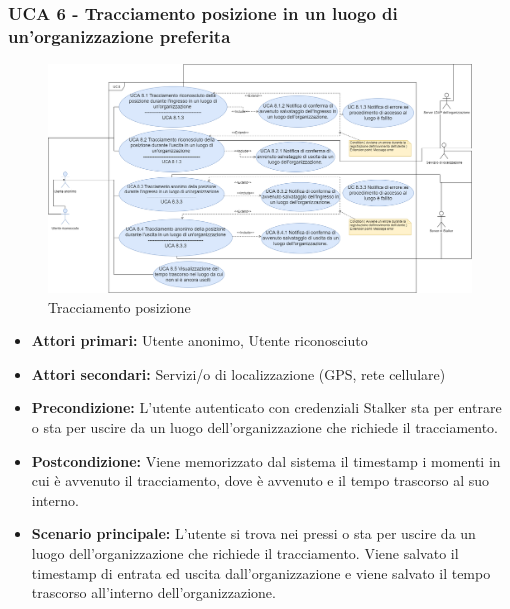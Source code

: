 \newpage

\subsubsection{UCA 6 - Tracciamento posizione in un luogo di un'organizzazione preferita}%

\begin{figure}[h]
	\centering
	\includegraphics[scale=0.3]{sezioni/UseCase/Immagini/UCA6.png}
	\caption{Tracciamento posizione}
\end{figure}

\begin{itemize}
	\item \textbf{Attori primari:} Utente anonimo, Utente riconosciuto
	\item \textbf{Attori secondari:} Servizi/o di localizzazione (GPS, rete cellulare)
	\item \textbf{Precondizione:} L'utente autenticato con credenziali Stalker sta per entrare o sta per uscire da un luogo dell'organizzazione che richiede il tracciamento.
	\item \textbf{Postcondizione:} Viene memorizzato dal sistema il timestamp i momenti in cui è avvenuto il tracciamento, dove è avvenuto e il tempo trascorso al suo interno.
	\item \textbf{Scenario principale:} L'utente si trova nei pressi o sta per uscire da un luogo dell'organizzazione che richiede il tracciamento. Viene salvato il timestamp di entrata ed uscita dall'organizzazione e viene salvato il tempo trascorso all'interno dell'organizzazione.
\end{itemize}

